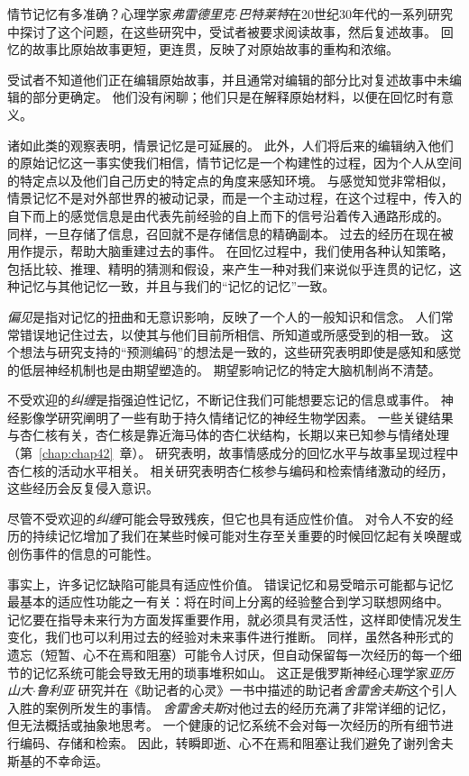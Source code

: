 \begin{proposition}[情节记忆在回忆过程中会发生变化] \label{box:52_1}
	
	\quad \quad 情节记忆有多准确？心理学家\textit{弗雷德里克$\cdot$巴特莱特}在20世纪30年代的一系列研究中探讨了这个问题，在这些研究中，受试者被要求阅读故事，然后复述故事。
	回忆的故事比原始故事更短，更连贯，反映了对原始故事的重构和浓缩。
	
	\quad \quad 受试者不知道他们正在编辑原始故事，并且通常对编辑的部分比对复述故事中未编辑的部分更确定。
	他们没有闲聊；他们只是在解释原始材料，以便在回忆时有意义。
	
	\quad \quad 诸如此类的观察表明，情景记忆是可延展的。
	此外，人们将后来的编辑纳入他们的原始记忆这一事实使我们相信，情节记忆是一个构建性的过程，因为个人从空间的特定点以及他们自己历史的特定点的角度来感知环境。
	与感觉知觉非常相似，情景记忆不是对外部世界的被动记录，而是一个主动过程，在这个过程中，传入的自下而上的感觉信息是由代表先前经验的自上而下的信号沿着传入通路形成的。
	同样，一旦存储了信息，召回就不是存储信息的精确副本。
	过去的经历在现在被用作提示，帮助大脑重建过去的事件。
	在回忆过程中，我们使用各种认知策略，包括比较、推理、精明的猜测和假设，来产生一种对我们来说似乎连贯的记忆，这种记忆与其他记忆一致，并且与我们的“记忆的记忆”一致。
	
\end{proposition}


\textit{偏见}是指对记忆的扭曲和无意识影响，反映了一个人的一般知识和信念。
人们常常错误地记住过去，以使其与他们目前所相信、所知道或所感受到的相一致。
这个想法与研究支持的“预测编码”的想法是一致的，这些研究表明即使是感知和感觉的低层神经机制也是由期望塑造的。
期望影响记忆的特定大脑机制尚不清楚。


不受欢迎的\textit{纠缠}是指强迫性记忆，不断记住我们可能想要忘记的信息或事件。
神经影像学研究阐明了一些有助于持久情绪记忆的神经生物学因素。
一些关键结果与杏仁核有关，杏仁核是靠近海马体的杏仁状结构，长期以来已知参与情绪处理（第~\ref{chap:chap42}~章）。
研究表明，故事情感成分的回忆水平与故事呈现过程中杏仁核的活动水平相关。
相关研究表明杏仁核参与编码和检索情绪激动的经历，这些经历会反复侵入意识。


尽管不受欢迎的\textit{纠缠}可能会导致残疾，但它也具有适应性价值。
对令人不安的经历的持续记忆增加了我们在某些时候可能对生存至关重要的时候回忆起有关唤醒或创伤事件的信息的可能性。


事实上，许多记忆缺陷可能具有适应性价值。
错误记忆和易受暗示可能都与记忆最基本的适应性功能之一有关：将在时间上分离的经验整合到学习联想网络中。
记忆要在指导未来行为方面发挥重要作用，就必须具有灵活性，这样即使情况发生变化，我们也可以利用过去的经验对未来事件进行推断。
同样，虽然各种形式的遗忘（短暂、心不在焉和阻塞）可能令人讨厌，但自动保留每一次经历的每一个细节的记忆系统可能会导致无用的琐事堆积如山。
这正是俄罗斯神经心理学家\textit{亚历山大$\cdot$鲁利亚} 研究并在《助记者的心灵》一书中描述的助记者\textit{舍雷舍夫斯}这个引人入胜的案例所发生的事情。
\textit{舍雷舍夫斯}对他过去的经历充满了非常详细的记忆，但无法概括或抽象地思考。
一个健康的记忆系统不会对每一次经历的所有细节进行编码、存储和检索。
因此，转瞬即逝、心不在焉和阻塞让我们避免了谢列舍夫斯基的不幸命运。




